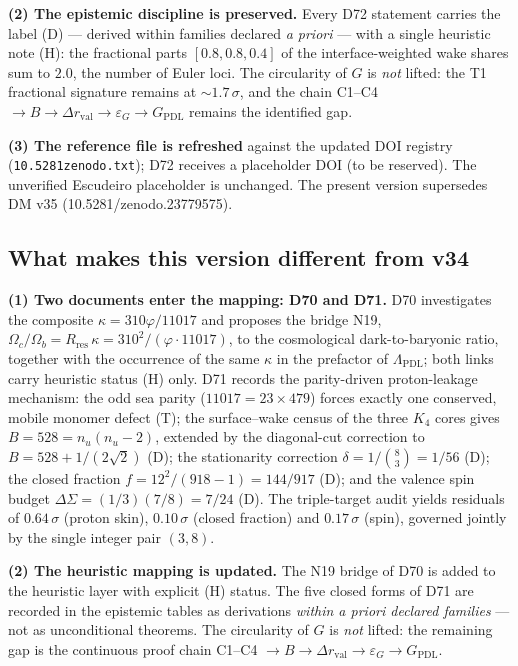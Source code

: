 \documentclass[11pt,a4paper]{article}
\theoremstyle{plain}
\theoremstyle{definition}
\theoremstyle{remark}
\begin{document}
\textbf{(2) The epistemic discipline is preserved.} Every D72 statement carries the label (D) --- derived within families declared \emph{a priori} --- with a single heuristic note (H): the fractional parts $[0.8,0.8,0.4]$ of the interface-weighted wake shares sum to $2.0$, the number of Euler loci. \textcolor{negativered}{The circularity of $G$ is \emph{not} lifted}: the T1 fractional signature remains at $\sim1.7\,\sigma$, and the chain C1--C4 $\to B\to\Delta r_{\mathrm{val}}\to\varepsilon_{G}\to G_{\mathrm{PDL}}$ remains the identified gap.

\textbf{(3) The reference file is refreshed} against the updated DOI registry (\texttt{10.5281zenodo.txt}); D72 receives a placeholder DOI (to be reserved). The unverified Escudeiro placeholder is unchanged. The present version supersedes DM v35 (10.5281/zenodo.23779575).

\subsection{What makes this version different from v34}

\textbf{(1) Two documents enter the mapping: D70 and D71.} D70 investigates the composite $\kappa=310\varphi/11017$ and proposes the bridge N19, $\Omega_{c}/\Omega_{b}=R_{\mathrm{res}}\,\kappa=310^{2}/(\varphi\cdot11017)$, to the cosmological dark-to-baryonic ratio, together with the occurrence of the same $\kappa$ in the prefactor of $\Lambda_{\mathrm{PDL}}$; both links carry heuristic status (H) only. D71 records the parity-driven proton-leakage mechanism: the odd sea parity ($11017=23\times479$) forces exactly one conserved, mobile monomer defect (T); the surface--wake census of the three $K_{4}$ cores gives $B=528=n_{u}(n_{u}-2)$, extended by the diagonal-cut correction to $B=528+1/(2\sqrt{2})$ (D); the stationarity correction $\delta=1/\binom{8}{3}=1/56$ (D); the closed fraction $f=12^{2}/(918-1)=144/917$ (D); and the valence spin budget $\Delta\Sigma=(1/3)(7/8)=7/24$ (D). The triple-target audit yields residuals of $0.64\,\sigma$ (proton skin), $0.10\,\sigma$ (closed fraction) and $0.17\,\sigma$ (spin), governed jointly by the single integer pair $(3,8)$.

\textbf{(2) The heuristic mapping is updated.} The N19 bridge of D70 is added to the heuristic layer with explicit (H) status. The five closed forms of D71 are recorded in the epistemic tables as derivations \emph{within a priori declared families} --- not as unconditional theorems. \textcolor{negativered}{The circularity of $G$ is \emph{not} lifted}: the remaining gap is the continuous proof chain C1--C4 $\to B\to\Delta r_{\mathrm{val}}\to\varepsilon_{G}\to G_{\mathrm{PDL}}$.
\end{document}
